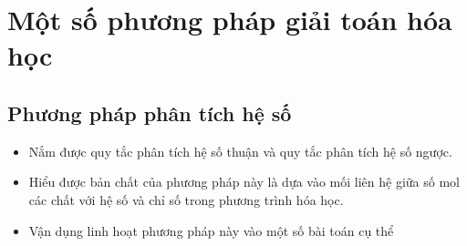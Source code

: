 \chapter{Một số phương pháp giải toán hóa học}
\section{Phương pháp phân tích hệ số}
\begin{Muctieu}
	\begin{itemize}
		\item Nắm được quy tắc phân tích hệ số thuận và quy tắc phân tích hệ số ngược.
		\item Hiểu được bản chất của phương pháp này là dựa vào mối liên hệ giữa số mol các chất với hệ số và chỉ số trong phương trình hóa học.
		\item Vận dụng linh hoạt phương pháp này vào một số bài toán cụ thể
	\end{itemize}
\end{Muctieu}
